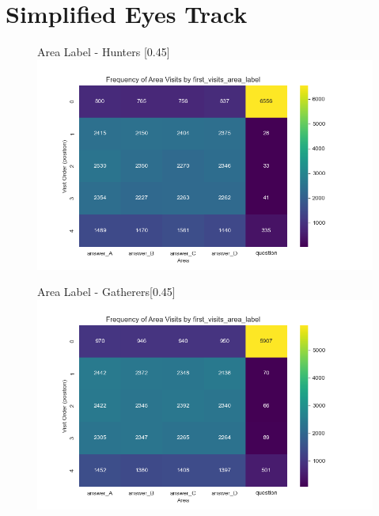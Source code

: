 \documentclass{article}
\begin{document}

\section{Simplified Eyes Track}

\begin{figure}[H]
  \centering
  \begin{subcaptionbox}{Area Label - Hunters \label{fig:al_h}}[0.45\textwidth]
    {\centering\includegraphics[width=\linewidth]{plots/matrix_first_visits_first_visits_area_label_hunters.png}}
  \end{subcaptionbox}
  \hfill
  \begin{subcaptionbox}{Area Label - Gatherers\label{fig:al_g}}[0.45\textwidth]
    {\centering\includegraphics[width=\linewidth]{plots/matrix_first_visits_first_visits_area_label_gatherers.png}}
  \end{subcaptionbox}
  

\end{figure}
\end{document}
